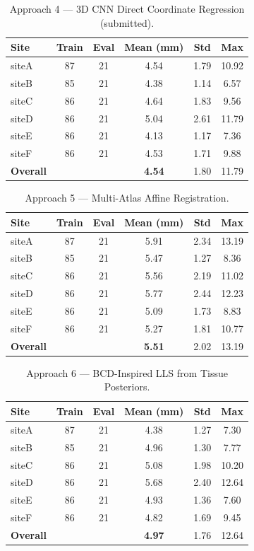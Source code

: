 \documentclass[11pt,letterpaper]{article}
\begin{document}
\begin{table}[h]
\centering
\caption{Approach 4 — 3D CNN Direct Coordinate Regression (submitted).}
\small
\begin{tabular}{lccccc}
\toprule
\textbf{Site} & \textbf{Train} & \textbf{Eval} & \textbf{Mean (mm)} & \textbf{Std} & \textbf{Max} \\
\midrule
siteA & 87 & 21 & 4.54 & 1.79 & 10.92 \\
siteB & 85 & 21 & 4.38 & 1.14 & 6.57 \\
siteC & 86 & 21 & 4.64 & 1.83 & 9.56 \\
siteD & 86 & 21 & 5.04 & 2.61 & 11.79 \\
siteE & 86 & 21 & 4.13 & 1.17 & 7.36 \\
siteF & 86 & 21 & 4.53 & 1.71 & 9.88 \\
\textbf{Overall} & & & \textbf{4.54} & 1.80 & 11.79 \\
\bottomrule
\end{tabular}
\end{table}

\begin{table}[h]
\centering
\caption{Approach 5 — Multi-Atlas Affine Registration.}
\small
\begin{tabular}{lccccc}
\toprule
\textbf{Site} & \textbf{Train} & \textbf{Eval} & \textbf{Mean (mm)} & \textbf{Std} & \textbf{Max} \\
\midrule
siteA & 87 & 21 & 5.91 & 2.34 & 13.19 \\
siteB & 85 & 21 & 5.47 & 1.27 & 8.36 \\
siteC & 86 & 21 & 5.56 & 2.19 & 11.02 \\
siteD & 86 & 21 & 5.77 & 2.44 & 12.23 \\
siteE & 86 & 21 & 5.09 & 1.73 & 8.83 \\
siteF & 86 & 21 & 5.27 & 1.81 & 10.77 \\
\textbf{Overall} & & & \textbf{5.51} & 2.02 & 13.19 \\
\bottomrule
\end{tabular}
\end{table}

\begin{table}[h]
\centering
\caption{Approach 6 — BCD-Inspired LLS from Tissue Posteriors.}
\small
\begin{tabular}{lccccc}
\toprule
\textbf{Site} & \textbf{Train} & \textbf{Eval} & \textbf{Mean (mm)} & \textbf{Std} & \textbf{Max} \\
\midrule
siteA & 87 & 21 & 4.38 & 1.27 & 7.30 \\
siteB & 85 & 21 & 4.96 & 1.30 & 7.77 \\
siteC & 86 & 21 & 5.08 & 1.98 & 10.20 \\
siteD & 86 & 21 & 5.68 & 2.40 & 12.64 \\
siteE & 86 & 21 & 4.93 & 1.36 & 7.60 \\
siteF & 86 & 21 & 4.82 & 1.69 & 9.45 \\
\textbf{Overall} & & & \textbf{4.97} & 1.76 & 12.64 \\
\bottomrule
\end{tabular}
\end{table}
\end{document}
